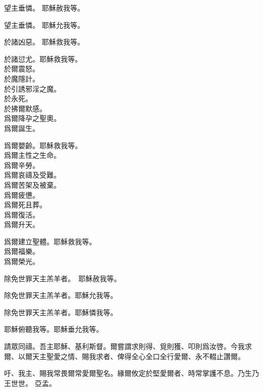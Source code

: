 \versicle 望主垂憐。 \hfill \response 耶穌赦我等。

\versicle 望主垂憐。 \hfill \response 耶穌允我等。

\versicle 於諸凶惡。 \hfill \response 耶穌救我等。

\versicle 於諸愆尤。\hfill \response 耶穌救我等。\\
於爾震怒。\\
於魔隱計。\\
於引誘邪淫之魔。\\
於永死。\\
於拂爾默感。\\
爲爾降孕之聖奧。\\
爲爾誕生。

\versicle 爲爾嬰齡。\hfill \response 耶穌救我等。\\
爲爾主性之生命。\\
爲爾辛勞。\\
爲爾哀禱及受難。\\
爲爾苦架及被棄。\\
爲爾疲憊。\\
爲爾死且葬。\\
爲爾復活。\\
爲爾升天。

\versicle 爲爾建立聖體。\hfill \response 耶穌救我等。\\
爲爾福樂。\\
爲爾榮光。

\versicle 除免世罪天主羔羊者。　\hfill \response 耶穌赦我等。

\versicle 除免世罪天主羔羊者。\hfill \response 耶穌允我等。

\versicle 除免世罪天主羔羊者。\hfill \response 耶穌憐我等。

\versicle 耶穌俯聽我等。\hfill \response 耶穌垂允我等。

\versicle 請眾同禱。{\cspace}吾主耶穌、基利斯督。爾嘗謂求則得、覓則獲、叩則爲汝啓。今我求爾、以爾天主聖愛之情、賜我求者、俾得全心全口全行愛爾、永不輟止讚爾。

吁、我主、賜我常畏爾常愛爾聖名。緣爾攸定於堅愛爾者、時常掌護不息。乃生乃王世世。 {\cspace}亞孟。

